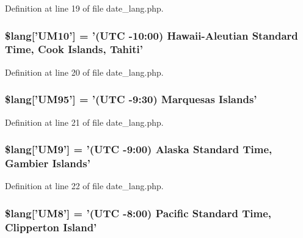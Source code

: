 Definition at line 19 of file date\-\_\-lang.\-php.

\hypertarget{date__lang_8php_a671d507e120e16f7e7718be0ed0aea74}{
\subsubsection[{\$lang}]{\setlength{\rightskip}{0pt plus 5cm}\$lang\mbox{[}'U\-M10'\mbox{]} = '(U\-T\-C -\/10\-:00) Hawaii-\/Aleutian Standard Time, Cook Islands, Tahiti'}}\label{date__lang_8php_a671d507e120e16f7e7718be0ed0aea74}


Definition at line 20 of file date\-\_\-lang.\-php.

\hypertarget{date__lang_8php_a7cd7a4418ccf42c7daae2a098ba8f9e6}{
\subsubsection[{\$lang}]{\setlength{\rightskip}{0pt plus 5cm}\$lang\mbox{[}'U\-M95'\mbox{]} = '(U\-T\-C -\/9\-:30) Marquesas Islands'}}\label{date__lang_8php_a7cd7a4418ccf42c7daae2a098ba8f9e6}


Definition at line 21 of file date\-\_\-lang.\-php.

\hypertarget{date__lang_8php_a5509302f8ddd971cb58e1f49f012bbac}{
\subsubsection[{\$lang}]{\setlength{\rightskip}{0pt plus 5cm}\$lang\mbox{[}'U\-M9'\mbox{]} = '(U\-T\-C -\/9\-:00) Alaska Standard Time, Gambier Islands'}}\label{date__lang_8php_a5509302f8ddd971cb58e1f49f012bbac}


Definition at line 22 of file date\-\_\-lang.\-php.

\hypertarget{date__lang_8php_ab3ed4c273fcb61197ef7d8e4bae07415}{
\subsubsection[{\$lang}]{\setlength{\rightskip}{0pt plus 5cm}\$lang\mbox{[}'U\-M8'\mbox{]} = '(U\-T\-C -\/8\-:00) Pacific Standard Time, Clipperton Island'}}\label{date__lang_8php_ab3ed4c273fcb61197ef7d8e4bae07415}


